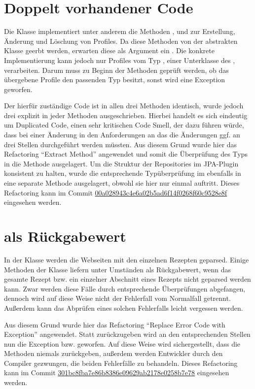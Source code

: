 \section{Doppelt vorhandener Code}
Die Klasse  implementiert unter anderem die Methoden ,  und  zur Erstellung, Änderung und Löschung von Profiles. Da diese Methoden von der abstrakten Klasse  geerbt werden, erwarten diese als Argument ein . Die konkrete Implementierung  kann jedoch nur Profiles vom Typ , einer Unterklasse des , verarbeiten. Darum muss zu Beginn der Methoden geprüft werden, ob das übergebene Profile den passenden Typ besitzt, sonst wird eine Exception geworfen.

Der hierfür zuständige Code ist in allen drei Methoden identisch, wurde jedoch drei explizit in jeder Methoden ausgeschrieben. Hierbei handelt es sich eindeutig um Duplicated Code, einen sehr kritischen Code Smell, der dazu führen würde, dass bei einer Änderung in den Anforderungen an das  die Änderungen ggf. an drei Stellen durchgeführt werden müssten. Aus diesem Grund wurde hier das Refactoring \enquote{Extract Method} angewendet und somit die Überprüfung des Typs in die Methode  ausgelagert. Um die Struktur der Repositories im JPA-Plugin konsistent zu halten, wurde die entsprechende Typüberprüfung im  ebenfalls in eine separate Methode ausgelagert, obwohl sie hier nur einmal auftritt. Dieses Refactoring kann im Commit \href{https://github.com/anditru/quickie/commit/00a028943c4e6a02b5ad6f14f0268f60c9528e8f}{00a028943c4e6a02b5ad6f14f0268f60c9528e8f} eingesehen werden.

\section{ als Rückgabewert}
In der Klasse  werden die Webseiten mit den einzelnen Rezepten geparsed. Einige Methoden der Klasse liefern unter Umständen  als Rückgabewert, wenn das gesamte Rezept bzw. ein einzelner Abschnitt eines Rezepts nicht geparsed werden kann. Zwar werden diese Fälle durch entsprechende Überprüfungen abgefangen, dennoch wird auf diese Weise nicht der Fehlerfall vom Normalfall getrennt. Außerdem kann das Abprüfen eines solchen Fehlerfalls leicht vergessen werden.

Aus diesem Grund wurde hier das Refactoring \enquote{Replace Error Code with Exception} angewendet. Statt  zurückzugeben wird an den entsprechenden Stellen nun die Exception  bzw.  geworfen. Auf diese Weise wird sichergestellt, dass die Methoden niemals  zurückgeben, außerdem werden Entwickler durch den Compiler gezwungen, die beiden Fehlerfälle zu behandeln. Dieses Refactoring kann im Commit \href{https://github.com/anditru/quickie/commit/301bc8fba7e86b8386e09629ab2178e0258b7e78}{301bc8fba7e86b8386e09629ab2178e0258b7e78} eingesehen werden.
